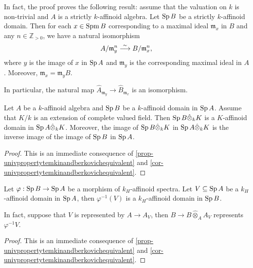 \begin{remark}\label{rmk-affdomainresidue}
    In fact, the proof proves the following result: assume that the valuation on $k$ is non-trivial and $A$ is a strictly $k$-affinoid algebra. Let $\Sp B$ be a strictly $k$-affinoid domain. Then for each $x\in \operatorname{Spm} B$ corresponding to a maximal ideal $\mathfrak{m}_x$ in $B$ and any $n\in \mathbb{Z}_{>0}$, we have a natural isomorphism
    \[
        A/\mathfrak{m}_y^n  \stackrel{\sim}{\longrightarrow} B/\mathfrak{m}_x^n,
    \]
    where $y$ is the image of $x$ in $\Sp A$ and $\mathfrak{m}_y$ is the corresponding maximal ideal in $A$. Moreover, $\mathfrak{m}_x=\mathfrak{m}_y B$. 
    
    In particular, the natural map $\hat{A}_{\mathfrak{m}_y}\rightarrow \hat{B}_{\mathfrak{m}_x}$ is an isomorphism.
\end{remark}

\begin{corollary}\label{cor-affdomainfieldext}
    Let $A$ be a $k$-affinoid algebra and $\Sp B$ be a $k$-affinoid domain in $\Sp A$. Assume that $K/k$ is an extension of complete valued field. Then $\operatorname{Sp} B\hat{\otimes}_k K$ is a $K$-affinoid domain in $\operatorname{Sp} A\hat{\otimes}_k K$. Moreover, the image of  $\operatorname{Sp} B\hat{\otimes}_k K$ in $\operatorname{Sp} A\hat{\otimes}_k K$ is the inverse image of the image of $\Sp B$ in $\Sp A$.
\end{corollary}
\begin{proof}
    This is an immediate consequence of \cref{prop-univpropertytemkinandberkovichequivalent} and \cref{cor-univpropertytemkinandberkovichequivalent}.
\end{proof}

\begin{corollary}\label{cor-fiberproductaffdomain}
    Let $\varphi:\operatorname{Sp} B\rightarrow \operatorname{Sp} A$ be a morphism of $k_H$-affinoid spectra. Let $V\subseteq \operatorname{Sp} A$ be a $k_H$-affinoid domain in $\Sp A$, then $\varphi^{-1}(V)$ is a $k_H$-affinoid domain in $\Sp B$.

    In fact, suppose that $V$ is represented by $A\rightarrow A_V$, then $B\rightarrow B\hat{\otimes}_A A_V$ represents $\varphi^{-1}V$.
\end{corollary}
\begin{proof}
    This is an immediate consequence of \cref{prop-univpropertytemkinandberkovichequivalent} and \cref{cor-univpropertytemkinandberkovichequivalent}.
    \iffalse
    Recall that $\Sp B\hat{\otimes}_A A_V$ is the fiber product of $\Sp B$ and $\Sp A_V$ over $\Sp A$:
    \[
        \begin{tikzcd}
            \Sp B\hat{\otimes}_A A_V \arrow[r] \arrow[d] \arrow[rd, "\square", phantom] & \Sp B \arrow[d, "\varphi"] \\
            \Sp A_V \arrow[r]                                                           & \Sp A                     
        \end{tikzcd}.
    \]
    \fi

\end{proof}



